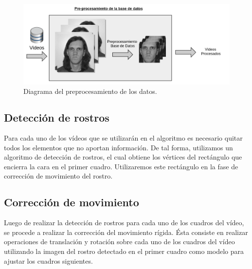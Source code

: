	\begin{figure}[tb]
		\centering
    		\includegraphics[width=1\textwidth]{Figuras/Diagramas/Preprocesamiento.png}
  		\caption{Diagrama del preprocesamiento de los datos.}
  		\label{algoritmo:fig:preprocesamiento}
	\end{figure}	

	
	\subsection{Detección de rostros}
	\label{algoritmo:det_rostro}
	Para cada uno de los vídeos que se utilizarán en el algoritmo es necesario quitar todos los elementos que no aportan información. De tal forma, utilizamos un algoritmo de detección de rostros, el cual obtiene los vértices del rectángulo que encierra la cara en el primer cuadro. Utilizaremos este rectángulo en la fase de corrección de movimiento del rostro. 
		
	\subsection{Corrección de movimiento}
	\label{algoritmo:cor_movimiento}
	Luego de realizar la detección de rostros para cada uno de los cuadros del vídeo, se procede a realizar la corrección del movimiento rígida. Ésta consiste en realizar operaciones de translación y rotación sobre cada uno de los cuadros del vídeo utilizando la imagen del rostro detectado en el primer cuadro como modelo para ajustar los cuadros siguientes.


